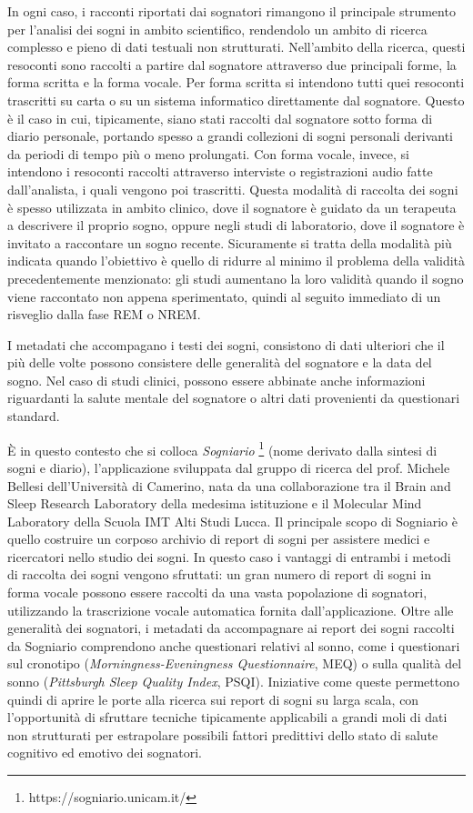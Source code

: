 In ogni caso, i racconti riportati dai sognatori rimangono il principale strumento per l'analisi dei sogni
in ambito scientifico, rendendolo un ambito di ricerca complesso e pieno di dati testuali non strutturati.
Nell'ambito della ricerca, questi resoconti sono raccolti a partire dal sognatore attraverso due principali
forme, la forma scritta e la forma vocale.
Per forma scritta si intendono tutti quei resoconti trascritti su carta o su un sistema informatico
direttamente dal sognatore.
Questo è il caso in cui, tipicamente, siano stati raccolti dal sognatore sotto forma di diario personale,
portando spesso a grandi collezioni di sogni personali derivanti da periodi di tempo più o meno prolungati.
Con forma vocale, invece, si intendono i resoconti raccolti attraverso interviste o registrazioni audio fatte
dall'analista, i quali vengono poi trascritti.
Questa modalità di raccolta dei sogni è spesso utilizzata in ambito clinico, dove il sognatore è guidato da un
terapeuta a descrivere il proprio sogno, oppure negli studi di laboratorio, dove il sognatore è invitato
a raccontare un sogno recente.
Sicuramente si tratta della modalità più indicata quando l'obiettivo è quello di ridurre al minimo il problema
della validità precedentemente menzionato: gli studi aumentano la loro validità quando il sogno viene raccontato
non appena sperimentato, quindi al seguito immediato di un risveglio dalla fase REM o NREM.

I metadati che accompagano i testi dei sogni, consistono di dati ulteriori che il più delle volte possono consistere
delle generalità del sognatore e la data del sogno.
Nel caso di studi clinici, possono essere abbinate anche informazioni riguardanti la salute mentale del sognatore o
altri dati provenienti da questionari standard. \newline

\`E in questo contesto che si colloca \textit{Sogniario} \footnote{https://sogniario.unicam.it/}
(nome derivato dalla sintesi di sogni e diario), l'applicazione sviluppata dal gruppo di ricerca del prof.
Michele Bellesi dell'Università di Camerino, nata da una collaborazione tra il Brain and Sleep Research Laboratory
della medesima istituzione e il Molecular Mind Laboratory della Scuola IMT Alti Studi Lucca.
Il principale scopo di Sogniario è quello costruire un corposo archivio di report di sogni per assistere medici e
ricercatori nello studio dei sogni.
In questo caso i vantaggi di entrambi i metodi di raccolta dei sogni vengono sfruttati:
un gran numero di report di sogni in forma vocale possono essere raccolti da una vasta popolazione di sognatori,
utilizzando la trascrizione vocale automatica fornita dall'applicazione.
Oltre alle generalità dei sognatori, i metadati da accompagnare ai report dei sogni raccolti da Sogniario
comprendono anche questionari relativi al sonno, come i questionari sul cronotipo
(\textit{Morningness-Eveningness Questionnaire}, MEQ) o sulla qualità del sonno
(\textit{Pittsburgh Sleep Quality Index}, PSQI).
Iniziative come queste permettono quindi di aprire le porte alla ricerca sui report di sogni su larga scala, con
l'opportunità di sfruttare tecniche tipicamente applicabili a grandi moli di dati non strutturati per
estrapolare possibili fattori predittivi dello stato di salute cognitivo ed emotivo dei sognatori.

